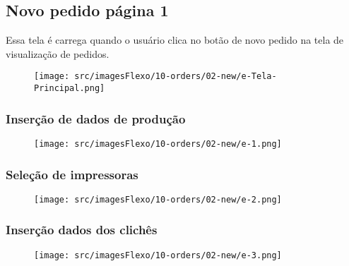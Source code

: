 \thispagestyle{fancy}
\vspace*{40 pt}
\subsection{Novo pedido página 1}\label{telaNovoPedidoPagina1}
 Essa tela é carrega quando o usuário clica no botão de novo pedido na tela de visualização de pedidos.
 \vspace*{\fill}
 \begin{figure}[h]
  \centering
  \texttt{[image: src/imagesFlexo/10-orders/02-new/e-Tela-Principal.png]}
\end{figure}
\vspace*{\fill}

\newpage
\thispagestyle{fancy}
\vspace*{40 pt}
\subsubsection{\small{Inserção de dados de produção}}\label{telaNovoPedidoPagina1InsercaoDeDadosDeProducao}
\vspace*{\fill}
\begin{figure}[h]
  \centering
  \texttt{[image: src/imagesFlexo/10-orders/02-new/e-1.png]}
\end{figure}
\vspace*{\fill}

\newpage
\thispagestyle{fancy}
\vspace*{40 pt}
\subsubsection{\small{Seleção de impressoras}}\label{telaNovoPedidoPagina1SelecaoDeImpressoras}
\vspace*{\fill}
\begin{figure}[h]
  \centering
  \texttt{[image: src/imagesFlexo/10-orders/02-new/e-2.png]}
\end{figure}
\vspace*{\fill}

\newpage
\thispagestyle{fancy}
\vspace*{40 pt}
\subsubsection{\small{Inserção dados dos clichês}}\label{telaNovoPedidoPagina1InsercaoDadosDosCliches}
\vspace*{\fill}
\begin{figure}[h]
  \centering
  \texttt{[image: src/imagesFlexo/10-orders/02-new/e-3.png]}
\end{figure}
\vspace*{\fill}

